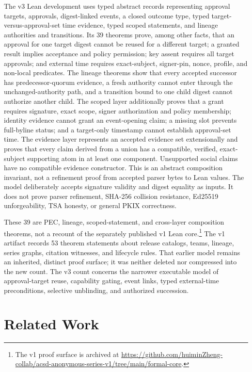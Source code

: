 \documentclass[11pt]{article}
\begin{document}
The v3 Lean development uses typed abstract records representing approval
targets, approvals, digest-linked events, a closed outcome type, typed
target-versus-approval-set time evidence, typed scoped statements, and lineage
authorities and transitions. Its 39 theorems
prove, among other facts, that an approval for one target digest cannot be
reused for a different target; a granted result implies acceptance and policy
permission; key assent requires all target approvals; and external time
requires exact-subject, signer-pin, nonce, profile, and non-local predicates.
The lineage theorems show that every accepted successor has predecessor-quorum
evidence, a fresh authority cannot enter through the unchanged-authority path,
and a transition bound to one child digest cannot authorize another child.
The scoped layer additionally proves that a grant requires signature, exact
scope, signer authorization and policy membership; identity evidence cannot
grant an event-opening claim; a missing slot prevents full-byline status; and
a target-only timestamp cannot establish approval-set time.
The evidence layer represents an accepted evidence set extensionally and proves
that every claim derived from a union has a compatible, verified, exact-subject
supporting atom in at least one component. Unsupported social claims have no
compatible evidence constructor. This is an abstract composition invariant,
not a refinement proof from accepted parser bytes to Lean values.
The model deliberately accepts signature validity and digest equality as inputs.
It does not prove parser refinement, SHA-256 collision resistance, Ed25519
unforgeability, TSA honesty, or general PKIX correctness.

These 39 are PEC, lineage, scoped-statement, and cross-layer composition theorems, not a recount of the
separately published v1 Lean core.\footnote{The v1 proof surface is archived at
\url{https://github.com/huiminZheng-collab/acsd-anonymous-series-v1/tree/main/formal-core}.}
The v1 artifact records 53 theorem statements
about release catalogs, teams, lineage, series graphs, citation witnesses, and
lifecycle rules. That earlier model remains an inherited, distinct proof
surface; it was neither deleted nor compressed into the new count. The v3
count concerns the narrower executable model of approval-target reuse,
capability gating, event links, typed external-time preconditions, selective
unblinding, and authorized succession.

\section{Related Work}
\end{document}
